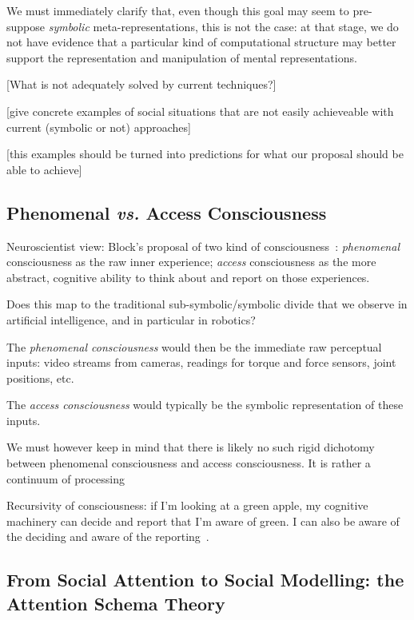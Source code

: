 \documentclass[a4paper]{article}
\newcommand{\vs}{\textit{vs.}\xspace}
\begin{document}
We must immediately clarify that, even though this goal may seem to pre-suppose
\emph{symbolic} meta-representations, this is not the case: at that stage, we do
not have evidence that a particular kind of computational structure may better
support the representation and manipulation of mental representations.

[What is not adequately solved by current techniques?]

[give concrete examples of social situations that are not easily achieveable
with current (symbolic or not) approaches]

[this examples should be turned into predictions for what our proposal should be
able to achieve]



\subsection{Phenomenal \vs Access Consciousness}

Neuroscientist view: Block's proposal of two kind of consciousness~\cite{block1996can}:
\emph{phenomenal} consciousness as the raw inner experience; \emph{access}
consciousness as the more abstract, cognitive ability to think about and report
on those experiences.

Does this map to the traditional sub-symbolic/symbolic divide that we observe in
artificial intelligence, and in particular in robotics?

The \emph{phenomenal consciousness} would then be the immediate raw perceptual
inputs: video streams from cameras, readings for torque and force sensors, joint
positions, etc.

The \emph{access consciousness} would typically be the symbolic representation
of these inputs.


We must however keep in mind that there is likely no such rigid dichotomy
between phenomenal consciousness and access consciousness. It is rather a
continuum of processing~\citep[p.55]{graziano2013consciousness}

Recursivity of consciousness: if I'm looking at a green apple, my cognitive
machinery can decide and report that I'm aware of green. I can also be aware of
the deciding and aware of the reporting~\citep[p.55]{graziano2013consciousness}.

\subsection{From Social Attention to Social Modelling: the Attention Schema Theory}
\end{document}
